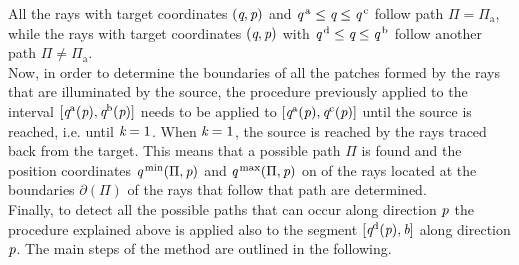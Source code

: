 All the rays with target coordinates $(\textit{q}, \textit{p})$ and $\textit{q}^{\,\textrm{a}}\leq\textit{q}\leq\textit{q}^{\,\textrm{c}}$ follow path $\Pi = \Pi_{\textrm{a}}$, while the rays with target coordinates $(\textit{q}, \textit{p})$ with $\textit{q}^{\,\textrm{d}}\leq\textit{q}\leq\textit{q}^{\,\textrm{b}}$ follow another path $\Pi \neq \Pi_{\textrm{a}}.$ 
%
\\ \indent Now, in order to determine the boundaries of \textrm{all} the patches formed by the rays that are illuminated by the source, the procedure previously applied to the interval 
$[\textit{q}^{\textrm{a}}(\textit{p}), \textit{q}^{\textrm{b}}(\textit{p})]$ needs to be applied to $[\textit{q}^{\textrm{a}}(\textit{p}),\textit{q}^{\textrm{c}}(\textit{p})]$ until the source is reached, i.e. until $\textit{k}=1$. When $\textit{k}=1$, the source is reached by the rays traced back from the target. This means that a possible path $\Pi$ is found and the position coordinates $\textit{q}^{\textrm{\,min}}(\Pi, \textit{p})$ and $\textit{q}^{\textrm{\,max}}(\Pi, \textit{p})$ on  of the rays located at the boundaries $\partial$$(\Pi)$ of the rays that follow that path are determined. \\ \indent 
Finally, to detect all the possible paths that can occur along direction $\textit{p}$ the procedure explained above is applied also to the segment $[\textit{q}^{\textrm{d}}(\textit{p}), \textit{\textrm{b}}]$ along direction $\textit{p}$. 
The main steps of the method are outlined in the following.
